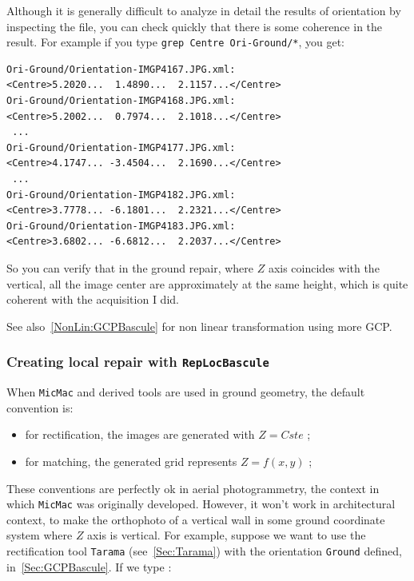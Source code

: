 Although it is generally difficult to analyze in detail the results of orientation
by inspecting the file, you can check quickly that there is some coherence in the result.
For example if you type {\tt grep Centre Ori-Ground/*}, you get:


{\scriptsize
\begin{verbatim}
Ori-Ground/Orientation-IMGP4167.JPG.xml:               <Centre>5.2020...  1.4890...  2.1157...</Centre>
Ori-Ground/Orientation-IMGP4168.JPG.xml:               <Centre>5.2002...  0.7974...  2.1018...</Centre>
 ...
Ori-Ground/Orientation-IMGP4177.JPG.xml:               <Centre>4.1747... -3.4504...  2.1690...</Centre>
 ...
Ori-Ground/Orientation-IMGP4182.JPG.xml:               <Centre>3.7778... -6.1801...  2.2321...</Centre>
Ori-Ground/Orientation-IMGP4183.JPG.xml:               <Centre>3.6802... -6.6812...  2.2037...</Centre>
\end{verbatim}
}

So you can verify that in the ground repair, where $Z$ axis coincides with the vertical,
all the image center are approximately at the same height, which is quite coherent with
the acquisition I did.

See also~\ref{NonLin:GCPBascule} for non linear transformation using more GCP.

\subsubsection{Creating local repair with {\tt RepLocBascule}}

\label{Sec:RepLocBascule}

When {\tt MicMac} and derived tools are used in ground geometry, the
default convention is:

\begin{itemize}
   \item  for rectification, the images are  generated with $Z=Cste$ ;
   \item  for matching, the generated grid represents $Z=f(x,y)$ ;
\end{itemize}


These conventions are perfectly ok in aerial photogrammetry, 
the context  in which {\tt MicMac} was originally developed. However,
it won't work in architectural context, to make the orthophoto of a
vertical wall in some ground coordinate system where $Z$ axis  is vertical.
For example, suppose we want to use the rectification tool {\tt Tarama} (see~\ref{Sec:Tarama})
with the orientation {\tt Ground} defined, in~\ref{Sec:GCPBascule}.
If we type :


